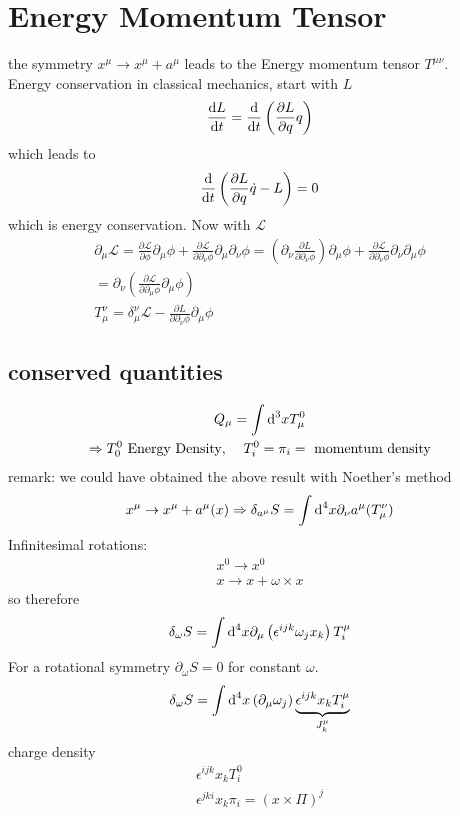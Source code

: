 \section{Energy Momentum Tensor}


the symmetry $x^\mu \rightarrow x^\mu + a^\mu$ leads to the Energy momentum tensor $T^{\mu\nu}$.\\
Energy conservation in classical mechanics, start with  $L$
$$
\frac{\text dL}{\text dt} = \frac{\text d}{\text dt}\left(\frac{\partial L}{\partial q}q\right)
$$
which leads to
$$
\frac{\text d}{\text dt}\left( \frac{\partial L}{\partial q}\dot q - L\right) = 0
$$
which is energy conservation. Now with $\mathcal L$
\begin{gather}
	\partial_\mu \mathcal L = \frac{\partial \mathcal L}{\partial \phi}\partial_\mu \phi + \frac{\partial \mathcal L}{\partial\partial_\nu \phi}\partial_\mu \partial_\nu\phi = \left(\partial_\nu \frac{\partial L}{\partial \partial_\nu \phi}\right)\partial_\mu\phi + \frac{\partial\mathcal L}{\partial \partial_\nu\phi}\partial_\nu \partial_\mu\phi\\
	= \partial_\nu\left(\frac{\partial\mathcal L}{\partial \partial_\mu\phi}\partial_\mu\phi\right)\\
	T^\nu_\mu = \delta_\mu^\nu \mathcal L - \frac{\partial L}{\partial \partial_\nu \phi}\partial_\mu \phi
\end{gather}

\subsection{conserved quantities}

\begin{gather}
	Q_\mu = \int \text d^3x T^0_\mu\\
	\Rightarrow T^0_0 \text{ Energy Density},\;\;\;\; T^0_i = \pi_i = \text{ momentum density}
\end{gather}
remark: we could have obtained the above result with Noether's method
$$
x^\mu \rightarrow x^\mu + a^\mu(x) \Rightarrow \delta_{a^\mu} S = \int \text d^4x \partial_\nu a^\mu (T^\nu_\mu)
$$
Infinitesimal rotations:
\begin{align*}
	x^0 \rightarrow x^0\\
	x \rightarrow x + \omega\times x
\end{align*}
so therefore
\begin{equation}
	\delta_\omega S = \int \text d^4x \partial_\mu \left(\epsilon^{ijk}\omega_j x_k\right)T^\mu_i
\end{equation}
For a rotational symmetry $\partial_\omega S = 0$ for constant $\omega$.
\begin{equation}
	\delta_\omega S = \int \text d^4x \left(\partial_\mu \omega_j\right)\underbrace{\epsilon^{ijk}x_k T^\mu_i}_{J^\mu_k}
\end{equation}
charge density
\begin{gather}
	\epsilon^{ijk} x_k T^0_i \nonumber\\
	\epsilon^{jki} x_k \pi_i = (x\times \Pi)^j
\end{gather}

